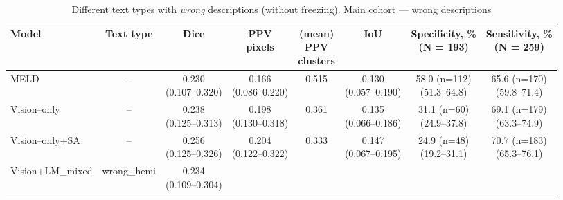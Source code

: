 \documentclass[FCD_GNN.tex]{subfiles}
\begin{document}
\begin{table}[H]
\centering
\tiny
\caption{Different text types with \emph{wrong} descriptions (without freezing). Main cohort — wrong descriptions}
\label{tab:wrong_main_cohort_mix_no_freeze}
\begin{tabular}{lccccccc}
\textbf{Model} &
\textbf{Text type} &
\textbf{Dice} &
\makecell{\textbf{PPV}\\\textbf{pixels}} &
\makecell{\textbf{(mean)} \\\textbf{PPV} \\\textbf{clusters}} & 
\textbf{IoU} & 
\makecell{\textbf{Specificity, \%} \\ (N = 193)}&
\makecell{\textbf{Sensitivity, \%} \\ (N = 259)}\\
\hline
MELD & -- &
\makecell{0.230\\(0.107--0.320)} &
\makecell{0.166\\(0.086--0.220)} &
\colorbox{green!15}{0.515} &
\makecell{0.130\\(0.057--0.190)} &
\makecell{58.0 (n=112) \\ (51.3--64.8)}&
\makecell{65.6 (n=170) \\ (59.8--71.4)} \\
\hline
Vision--only & -- &
\makecell{0.238\\(0.125--0.313)} &
\makecell{0.198\\(0.130--0.318)} &
0.361 &
\makecell{0.135\\(0.066--0.186)} &
\makecell{31.1 (n=60) \\ (24.9--37.8)} &
\makecell{\colorbox{orange!15}{69.1 (n=179)} \\ (63.3--74.9)} \\
\hline
Vision--only+SA & -- &
\makecell{\colorbox{green!15}{0.256} \\ (0.125--0.326)} &
\makecell{0.204\\ (0.122--0.322)} &
0.333 &
\makecell{\colorbox{green!15}{0.147}\\ (0.067--0.195)} &
\makecell{24.9 (n=48) \\ (19.2--31.1)} &
\makecell{\colorbox{green!15}{70.7 (n=183)} \\ (65.3--76.1)} \\
\hline
Vision+LM\_mixed & wrong\_hemi &
\makecell{0.234 \\ (0.109--0.304)} &

\end{tabular}
\end{table}
\end{document}
